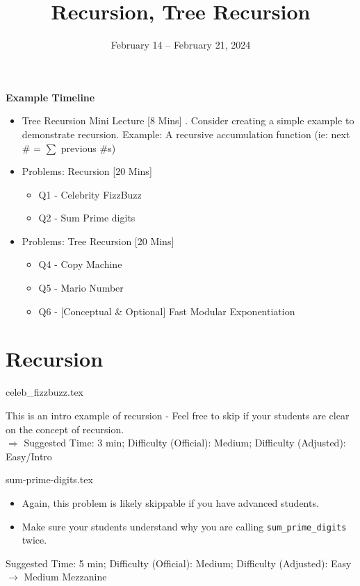 \documentclass{exam}
\title{Recursion, Tree Recursion}
\date{February 14 -- February 21, 2024}
\begin{document}
\maketitle

\begin{meta}
    \textbf{Example Timeline}
    \begin{itemize}
        \item Tree Recursion Mini Lecture [8 Mins]
            . Consider creating a simple example to demonstrate recursion. Example: A recursive accumulation function (ie: next \# = $\sum$ previous \#s)
        \item Problems: Recursion [20 Mins]
        \begin{itemize}
            \item Q1 - Celebrity FizzBuzz
            \item Q2 - Sum Prime digits
        \end{itemize}
        \item Problems: Tree Recursion [20 Mins]
        \begin{itemize}
            \item Q4 - Copy Machine
            \item Q5 - Mario Number
            \item Q6 - [Conceptual \& Optional] Fast Modular Exponentiation
        \end{itemize}
        
    \end{itemize}
\end{meta}

\section{Recursion}
\begin{questions}
    {celeb_fizzbuzz.tex}
    \begin{questionmeta}
        This is an intro example of recursion - Feel free to skip if your students are clear on the concept of recursion.\\
        $\Rightarrow$ Suggested Time: 3 min; Difficulty (Official): Medium; Difficulty (Adjusted): Easy/Intro
      \end{questionmeta}

    {sum-prime-digits.tex}
    \begin{questionmeta}
        \begin{itemize}
            \item Again, this problem is likely skippable if you have advanced students.
            \item Make sure your students understand why you are calling \lstinline{sum_prime_digits} twice.
        \end{itemize}    
        Suggested Time: 5 min; Difficulty (Official): Medium; Difficulty (Adjusted): Easy $\rightarrow$ Medium Mezzanine
      \end{questionmeta}
    
\end{questions}
\end{document}
